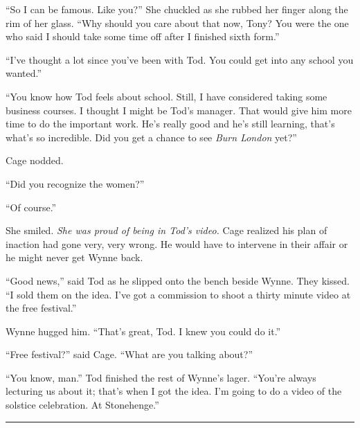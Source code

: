 ``So I can be famous. Like you?'' She chuckled as she rubbed her finger along the rim of her glass. ``Why should you care about that now, Tony? You were the one who said I should take some time off after I finished sixth form.''

``I've thought a lot since you've been with Tod. You could get into any school you wanted.''

``You know how Tod feels about school. Still, I have considered taking some business courses. I thought I might be Tod's manager. That would give him more time to do the important work. He's really good and he's still learning, that's what's so incredible. Did you get a chance to see \textit{Burn London} yet?''

Cage nodded.

``Did you recognize the women?''

``Of course.''

She smiled. \textit{She was proud of being in Tod's video.} Cage realized his plan of inaction had gone very, very wrong. He would have to intervene in their affair or he might never get Wynne back.

``Good news,'' said Tod as he slipped onto the bench beside Wynne. They kissed. ``I sold them on the idea. I've got a commission to shoot a thirty minute video at the free festival.''

Wynne hugged him. ``That's great, Tod. I knew you could do it.''

``Free festival?'' said Cage. ``What are you talking about?''

``You know, man.'' Tod finished the rest of Wynne's lager. ``You're always lecturing us about it; that's when I got the idea. I'm going to do a video of the solstice celebration. At Stonehenge.''

\fancybreak{* * *}

